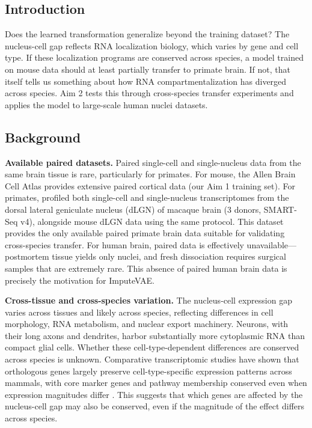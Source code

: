 \documentclass[11pt]{article}
\begin{document}
\subsection*{Introduction}

Does the learned transformation generalize beyond the training dataset? The nucleus-cell gap reflects RNA localization biology, which varies by gene and cell type. If these localization programs are conserved across species, a model trained on mouse data should at least partially transfer to primate brain. If not, that itself tells us something about how RNA compartmentalization has diverged across species. Aim 2 tests this through cross-species transfer experiments and applies the model to large-scale human nuclei datasets.

\subsection*{Background}

\textbf{Available paired datasets.} Paired single-cell and single-nucleus data from the same brain tissue is rare, particularly for primates. For mouse, the Allen Brain Cell Atlas provides extensive paired cortical data (our Aim 1 training set). For primates, \citet{bakken2021single} profiled both single-cell and single-nucleus transcriptomes from the dorsal lateral geniculate nucleus (dLGN) of macaque brain (3 donors, SMART-Seq v4), alongside mouse dLGN data using the same protocol. This dataset provides the only available paired primate brain data suitable for validating cross-species transfer. For human brain, paired data is effectively unavailable---postmortem tissue yields only nuclei, and fresh dissociation requires surgical samples that are extremely rare. This absence of paired human brain data is precisely the motivation for ImputeVAE.

\textbf{Cross-tissue and cross-species variation.} The nucleus-cell expression gap varies across tissues \citep{ding2020systematic} and likely across species, reflecting differences in cell morphology, RNA metabolism, and nuclear export machinery. Neurons, with their long axons and dendrites, harbor substantially more cytoplasmic RNA than compact glial cells. Whether these cell-type-dependent differences are conserved across species is unknown. Comparative transcriptomic studies have shown that orthologous genes largely preserve cell-type-specific expression patterns across mammals, with core marker genes and pathway membership conserved even when expression magnitudes differ \citep{hodge2019conserved, bakken2021single}. This suggests that which genes are affected by the nucleus-cell gap may also be conserved, even if the magnitude of the effect differs across species.
\end{document}

